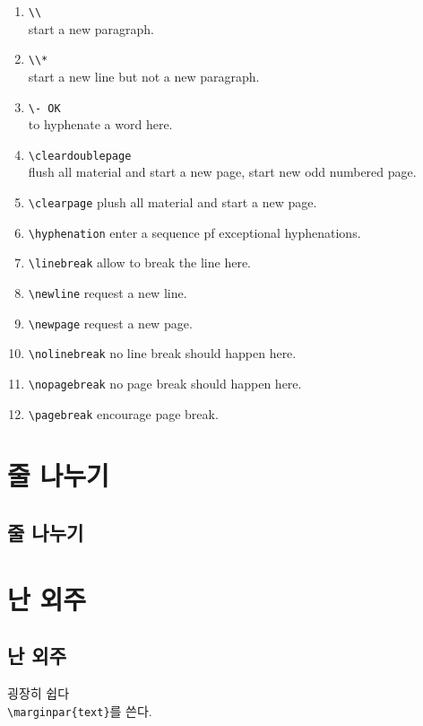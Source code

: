 \documentclass[12pt,a4paper]{book}
\begin{document}
		\begin{enumerate}[ topsep=0.0em, itemsep=-0.5em ]
		\item	\verb|\\| \\
				start a new paragraph.
		\item	\verb|\\*| \\
				 start a new line but not a new paragraph.
		\item	\verb|\- OK| \\
				to hyphenate a word here.
		\item	\verb|\cleardoublepage| \\
				flush all material and start a new page, start new odd numbered page.
		\item	\verb|\clearpage| plush all material and start a new page.
		\item	\verb|\hyphenation| enter a sequence pf exceptional hyphenations.
		\item	\verb|\linebreak| allow to break the line here.
		\item	\verb|\newline| request a new line.
		\item	\verb|\newpage| request a new page.
		\item	\verb|\nolinebreak| no line break should happen here.
		\item	\verb|\nopagebreak| no page break should happen here.
		\item	\verb|\pagebreak| encourage page break.
		\end{enumerate}
	
	



\newpage
\chapter{줄 나누기}
		
	\newpage
	\section{줄 나누기}
	

\newpage
\chapter{난 외주}

	\newpage
	\section{난 외주}
	
		굉장히 쉽다\\
		\verb|\marginpar{text}|를 쓴다.\\
	
\end{document}
